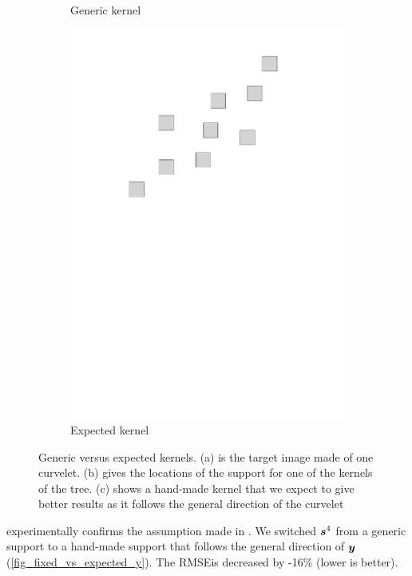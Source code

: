 \begin{figure}[!ht]
\begin{subfigure}[b]{0.32\textwidth}
	\caption{Generic kernel}
\end{subfigure}
\begin{subfigure}[b]{0.32\textwidth}\centering
	\includegraphics[width=\textwidth]{figures/manual-better-support/support-better.pdf}
	\caption{Expected kernel}
\end{subfigure}
\caption{Generic versus expected kernels. (a) is the target image made of one curvelet. (b) gives the locations of the support for one of the kernels of the tree. (c) shows a hand-made kernel that we expect to give better results as it follows the general direction of the curvelet}\label{fig_fixed_vs_expected}
\end{figure}

 experimentally confirms the assumption made in . We switched $\bm{s}^4$ from a generic support to a hand-made support that follows the general direction of $\bm{y}$ (\cref{fig_fixed_vs_expected_y}). The RMSE\footnotemark[1] is decreased by -16\% (lower is better).

